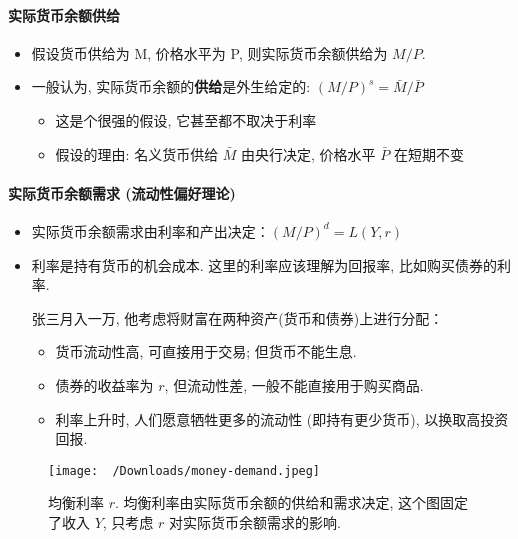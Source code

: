 \documentclass[11pt]{ctexart}
\begin{document}
\paragraph{实际货币余额供给}

\begin{itemize}
\item
  假设货币供给为 M, 价格水平为 P, 则实际货币余额供给为 $M/P$.
\item
  一般认为, 实际货币余额的\textbf{供给}是外生给定的: $(M/P)^s = \bar{M}/ \bar{P}$

  \begin{itemize}
  \item
    这是个很强的假设, 它甚至都不取决于利率
  \item
    假设的理由: 名义货币供给 $\bar{M}$ 由央行决定, 价格水平 $\bar{P}$ 在短期不变
  \end{itemize}
\end{itemize}

\paragraph{实际货币余额需求 (流动性偏好理论)}

\begin{itemize}
\item
  实际货币余额需求由利率和产出决定：$(M/P)^d = L(Y, r)$
\item
  利率是持有货币的机会成本. 这里的利率应该理解为回报率, 比如购买债券的利率.
  
  张三月入一万, 他考虑将财富在两种资产(货币和债券)上进行分配：

  \begin{itemize}
  \item
    货币流动性高, 可直接用于交易; 但货币不能生息.
  \item
    债券的收益率为 $r$, 但流动性差, 一般不能直接用于购买商品.
  \item
    利率上升时, 人们愿意牺牲更多的流动性 (即持有更少货币), 以换取高投资回报.
  \end{itemize}
\end{itemize}

\begin{center}
\begin{figure}[htbp]
\centering
\texttt{[image: ~/Downloads/money-demand.jpeg]}
\caption{\centering 均衡利率 $r$. 均衡利率由实际货币余额的供给和需求决定, 这个图固定了收入 $Y$, 只考虑 $r$ 对实际货币余额需求的影响.}
\end{figure}  
\end{center}
\end{document}
